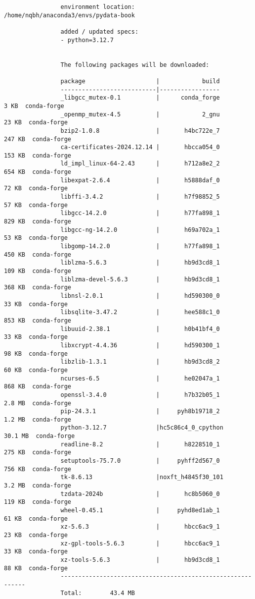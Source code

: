 \documentclass{article}
\begin{document}
\begin{itemize}
\begin{itemize}
\begin{itemize}
\begin{verbatim}
				environment location: /home/nqbh/anaconda3/envs/pydata-book
				
				added / updated specs:
				- python=3.12.7
				
				
				The following packages will be downloaded:
				
				package                    |            build
				---------------------------|-----------------
				_libgcc_mutex-0.1          |      conda_forge           3 KB  conda-forge
				_openmp_mutex-4.5          |            2_gnu          23 KB  conda-forge
				bzip2-1.0.8                |       h4bc722e_7         247 KB  conda-forge
				ca-certificates-2024.12.14 |       hbcca054_0         153 KB  conda-forge
				ld_impl_linux-64-2.43      |       h712a8e2_2         654 KB  conda-forge
				libexpat-2.6.4             |       h5888daf_0          72 KB  conda-forge
				libffi-3.4.2               |       h7f98852_5          57 KB  conda-forge
				libgcc-14.2.0              |       h77fa898_1         829 KB  conda-forge
				libgcc-ng-14.2.0           |       h69a702a_1          53 KB  conda-forge
				libgomp-14.2.0             |       h77fa898_1         450 KB  conda-forge
				liblzma-5.6.3              |       hb9d3cd8_1         109 KB  conda-forge
				liblzma-devel-5.6.3        |       hb9d3cd8_1         368 KB  conda-forge
				libnsl-2.0.1               |       hd590300_0          33 KB  conda-forge
				libsqlite-3.47.2           |       hee588c1_0         853 KB  conda-forge
				libuuid-2.38.1             |       h0b41bf4_0          33 KB  conda-forge
				libxcrypt-4.4.36           |       hd590300_1          98 KB  conda-forge
				libzlib-1.3.1              |       hb9d3cd8_2          60 KB  conda-forge
				ncurses-6.5                |       he02047a_1         868 KB  conda-forge
				openssl-3.4.0              |       h7b32b05_1         2.8 MB  conda-forge
				pip-24.3.1                 |     pyh8b19718_2         1.2 MB  conda-forge
				python-3.12.7              |hc5c86c4_0_cpython        30.1 MB  conda-forge
				readline-8.2               |       h8228510_1         275 KB  conda-forge
				setuptools-75.7.0          |     pyhff2d567_0         756 KB  conda-forge
				tk-8.6.13                  |noxft_h4845f30_101         3.2 MB  conda-forge
				tzdata-2024b               |       hc8b5060_0         119 KB  conda-forge
				wheel-0.45.1               |     pyhd8ed1ab_1          61 KB  conda-forge
				xz-5.6.3                   |       hbcc6ac9_1          23 KB  conda-forge
				xz-gpl-tools-5.6.3         |       hbcc6ac9_1          33 KB  conda-forge
				xz-tools-5.6.3             |       hb9d3cd8_1          88 KB  conda-forge
				------------------------------------------------------------
				Total:        43.4 MB
				

\end{verbatim}
\end{itemize}
\end{itemize}
\end{itemize}
\end{document}
